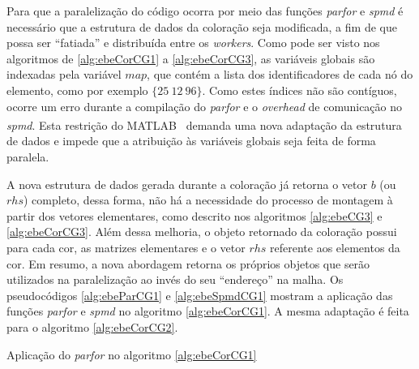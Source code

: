 \documentclass[
    12pt,               %
    openright,          %
    oneside,
    a4paper,            %
    english,            %
    french,             %
    spanish,            %
    brazil              %
    ]{abntex2}
\newcommand{\matlab}{MATLAB\textsuperscript{\textregistered} \ }
\begin{document}
Para que a paralelização do código ocorra por meio das funções \textit{parfor} e \textit{spmd} é necessário que a estrutura de dados da coloração seja modificada, a fim de que possa ser ``fatiada'' e distribuída entre os \textit{workers}. Como pode ser visto nos algoritmos de \ref{alg:ebeCorCG1} a \ref{alg:ebeCorCG3}, as variáveis globais são indexadas pela variável $map$, que contém a lista dos identificadores de cada nó do elemento, como por exemplo $\{25 \ 12 \ 96\}$. Como estes índices não são contíguos, ocorre um erro durante a compilação do \textit{parfor} e o \textit{overhead} de comunicação no \textit{spmd}. Esta restrição do \matlab demanda uma nova adaptação da estrutura de dados e impede que a atribuição às variáveis globais seja feita de forma paralela.

A nova estrutura de dados gerada durante a coloração já retorna o vetor $b$ (ou $rhs$) completo, dessa forma, não há a necessidade do processo de montagem à partir dos vetores elementares, como descrito nos algoritmos \ref{alg:ebeCG3} e \ref{alg:ebeCorCG3}. Além dessa melhoria, o objeto retornado da coloração possui para cada cor, as matrizes elementares e o vetor $rhs$ referente aos elementos da cor. Em resumo, a nova abordagem retorna os próprios objetos que serão utilizados na paralelização ao invés do seu ``endereço'' na malha. Os pseudocódigos \ref{alg:ebeParCG1} e \ref{alg:ebeSpmdCG1} mostram a aplicação das funções \textit{parfor} e \textit{spmd} no algoritmo \ref{alg:ebeCorCG1}. A mesma adaptação é feita para o algoritmo \ref{alg:ebeCorCG2}.



\begin{algorithm}	
	\caption{\label{alg:ebeParCG1}Aplicação do \textit{parfor} no algoritmo \ref{alg:ebeCorCG1}} 
	\begin{algorithmic}[1]
		\EndFor
		\EndFor
	\end{algorithmic}
\end{algorithm}
\end{document}

